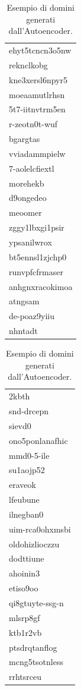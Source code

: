 \begin{table}[!bp]
\centering
	\begin{tabular}{l}
	\toprule
	ehyt5tcncn3o5nw \\
	reknclkobg \\
	kne3xersl6npyr5 \\
	moeaamutlrhsn \\
	5t7-iitnvtrm5en \\
	r-zeotn0t-wuf \\
	bgargtas \\
	vviadammpielw \\
	7-aolelcfiextl \\
	morehekb \\
	d9ongedeo  \\
	meoomer \\
	zggy1lbxgi1psir \\
	ypsanilwrox \\
	bt5ennsl1zjchp0 \\
	runvpfcfrmaser \\
	anhgnxracokimoa \\
	atngsam \\
	de-poaz9yiiu \\
	nhntadt \\
	\bottomrule
	\end{tabular}
	\begin{tabular}{l}
	\toprule
	2kbth \\
	snd-drcepn \\
	sievd0 \\
	ono5ponlanafhic \\
	mmd0-5-ile \\
	su1aojp52 \\
	eraveok \\
	lfeubune \\
	ilnegban0 \\
	uim-rca0ohxmsbi \\
	oldohizlioczzu \\
	dodttiune \\
	ahoinin3 \\
	etiso9oo \\
	qi8gtuyte-ssg-n \\
	mlsrp8gf \\
	ktb1r2vb \\
	ptsdrqtanflog \\
	mcng5tsotnless \\
	rrhtsrceu \\
	\bottomrule
	\end{tabular}
\caption{Esempio di domini generati dall'Autoencoder. \label{tab:autoenc}}
\end{table}

